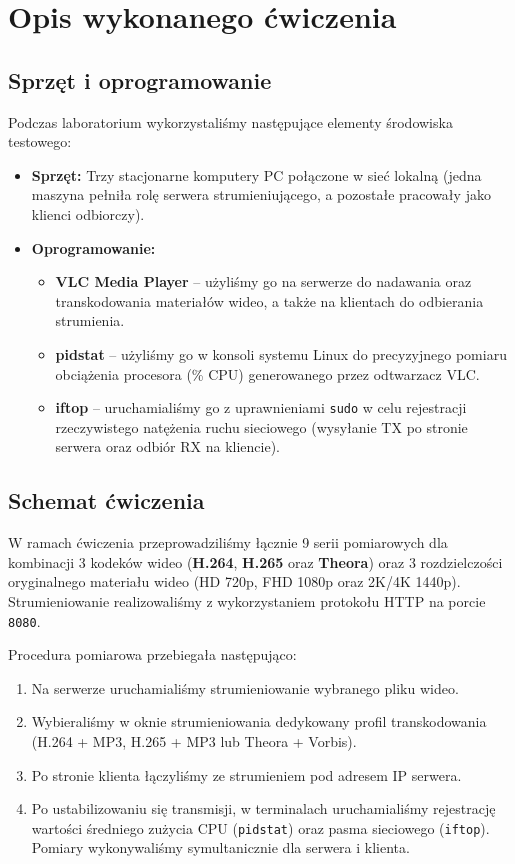 \documentclass[11pt, a4paper]{article}
\begin{document}


\setcounter{section}{1}

\section{Opis wykonanego ćwiczenia}

\subsection{Sprzęt i oprogramowanie}
Podczas laboratorium wykorzystaliśmy następujące elementy środowiska testowego:
\begin{itemize}
    \item \textbf{Sprzęt:} Trzy stacjonarne komputery PC połączone w sieć lokalną (jedna maszyna pełniła rolę serwera strumieniującego, a pozostałe pracowały jako klienci odbiorczy).
    \item \textbf{Oprogramowanie:}
    \begin{itemize}
        \item \textbf{VLC Media Player} -- użyliśmy go na serwerze do nadawania oraz transkodowania materiałów wideo, a także na klientach do odbierania strumienia.
        \item \textbf{pidstat} -- użyliśmy go w konsoli systemu Linux do precyzyjnego pomiaru obciążenia procesora (\% CPU) generowanego przez odtwarzacz VLC.
        \item \textbf{iftop} -- uruchamialiśmy go z uprawnieniami \texttt{sudo} w celu rejestracji rzeczywistego natężenia ruchu sieciowego (wysyłanie TX po stronie serwera oraz odbiór RX na kliencie).
    \end{itemize}
\end{itemize}

\subsection{Schemat ćwiczenia}
W ramach ćwiczenia przeprowadziliśmy łącznie 9 serii pomiarowych dla kombinacji 3 kodeków wideo (\textbf{H.264}, \textbf{H.265} oraz \textbf{Theora}) oraz 3 rozdzielczości oryginalnego materiału wideo (HD 720p, FHD 1080p oraz 2K/4K 1440p). Strumieniowanie realizowaliśmy z wykorzystaniem protokołu HTTP na porcie \texttt{8080}.

Procedura pomiarowa przebiegała następująco:
\begin{enumerate}
    \item Na serwerze uruchamialiśmy strumieniowanie wybranego pliku wideo.
    \item Wybieraliśmy w oknie strumieniowania dedykowany profil transkodowania (H.264 + MP3, H.265 + MP3 lub Theora + Vorbis).
    \item Po stronie klienta łączyliśmy ze strumieniem pod adresem IP serwera.
    \item Po ustabilizowaniu się transmisji, w terminalach uruchamialiśmy rejestrację wartości średniego zużycia CPU (\texttt{pidstat}) oraz pasma sieciowego (\texttt{iftop}). Pomiary wykonywaliśmy symultanicznie dla serwera i klienta.
\end{enumerate}
\end{document}
